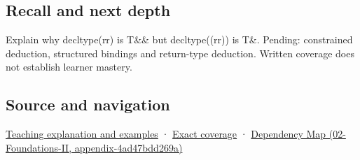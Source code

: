 \subsection{Recall and next depth}\label{appendix-5d4252a42886-recall-and-next-depth}

Explain why decltype(rr) is T\&\& but decltype((rr)) is T\&. Pending: constrained deduction, structured bindings and return-type deduction. Written coverage does not establish learner mastery.

\subsection{Source and navigation}\label{appendix-5d4252a42886-source-and-navigation}

\hyperref[01-foundations-i-ch003-an-expression-has-a-type-and-a-category]{Teaching explanation and examples} · \hyperref[appendix-fd090d982a15-m008---parts-113-126]{Exact coverage} · \href{../02-Foundations-II/main.pdf\#nameddest=appendix-4ad47bdd269a}{Dependency Map (02-Foundations-II, appendix-4ad47bdd269a)}
